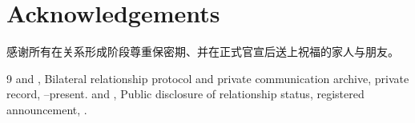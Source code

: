 \documentclass[9pt,twocolumn]{extarticle}
\begin{document}
\section*{Acknowledgements}
感谢所有在关系形成阶段尊重保密期、并在正式官宣后送上祝福的家人与朋友。

\begin{thebibliography}{9}\fontsize{6.7}{8.2}\selectfont
{} \PartnerA{} and \PartnerB{}, Bilateral relationship protocol and private communication archive, private record, \FirstMeetingDate{}--present.
 \PartnerA{} and \PartnerB{}, Public disclosure of relationship status, registered announcement, \AnnouncementDate{}.
\end{thebibliography}
\end{document}
